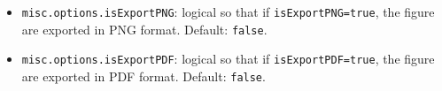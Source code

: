 \begin{itemize}
\begin{itemize}
\item \lstinline[basicstyle = \mlttfamily \small ]!misc.options.isExportPNG!: logical so that if \lstinline[basicstyle = \mlttfamily \small ]!isExportPNG=true!, the figure are exported in PNG format. Default: \lstinline[basicstyle = \mlttfamily \small ]!false!.
\item \lstinline[basicstyle = \mlttfamily \small ]!misc.options.isExportPDF!: logical so that if \lstinline[basicstyle = \mlttfamily \small ]!isExportPDF=true!, the figure are exported in PDF format. Default: \lstinline[basicstyle = \mlttfamily \small ]!false!.
\end{itemize}
\end{itemize}